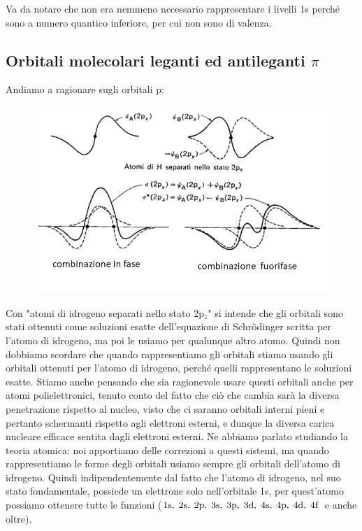\vspace{0.4cm}Va da notare che non era nemmeno necessario rappresentare i livelli 1s perché sono a numero quantico inferiore, per cui non sono di valenza.
\newpage
\subsection{Orbitali molecolari leganti ed antileganti $\pi$}
Andiamo a ragionare sugli orbitali p:

\begin{figure}[htp]
    \centering
    \includegraphics[width=14cm]{immagini/orbitali_molecolari_pigreco.png}
\end{figure}

\vspace{-1cm}Con "atomi di idrogeno separati nello stato 2p$_z$" si intende che gli orbitali sono stati ottenuti come soluzioni esatte dell'equazione di Schrödinger scritta per l'atomo di idrogeno, ma poi le usiamo per qualunque altro atomo. Quindi non dobbiamo scordare che quando rappresentiamo gli orbitali stiamo usando gli orbitali ottenuti per l'atomo di idrogeno, perché quelli rappresentano le soluzioni esatte. Stiamo anche pensando che sia ragionevole usare questi orbitali anche per atomi polielettronici, tenuto conto del fatto che ciò che cambia sarà la diversa penetrazione rispetto al nucleo, visto che ci saranno orbitali interni pieni e pertanto schermanti rispetto agli elettroni esterni, e dunque la diversa carica nucleare efficace sentita dagli elettroni esterni. Ne abbiamo parlato studiando la teoria atomica: noi apportiamo delle correzioni a questi sistemi, ma quando rappresentiamo le forme degli orbitali usiamo sempre gli orbitali dell'atomo di idrogeno. Quindi indipendentemente dal fatto che l'atomo di idrogeno, nel suo stato fondamentale, possiede un elettrone solo nell'orbitale 1s, per quest'atomo possiamo ottenere tutte le funzioni ($ \rm 1s, \; 2s, \; 2p, \; 3s, \; 3p, \; 3d, \; 4s, \; 4p, \; 4d, \; 4f$ e anche oltre).

